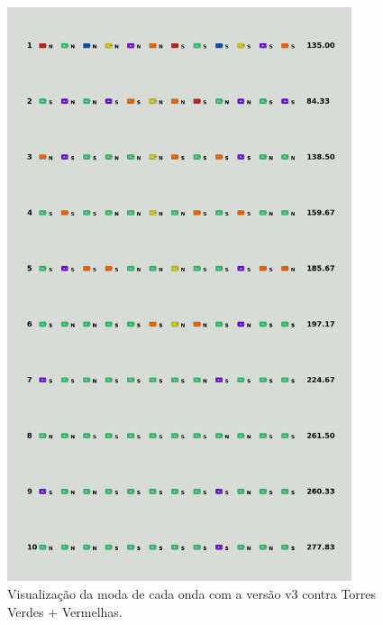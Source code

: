 \begin{figure}[H]
  \centering
  \includegraphics[width=0.9\textwidth]{figuras/td/td_greenred_ai_mode_3_1.png}
  \caption{Visualização da moda de cada onda com a versão v3 contra Torres Verdes + Vermelhas.}
  \label{fig:td-moda-greenred-3-1}
\end{figure}

